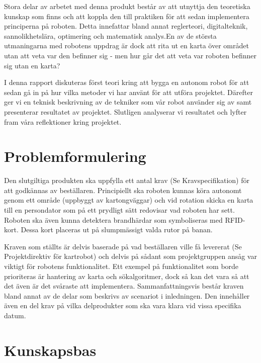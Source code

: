 \documentclass[a4paper,12pt,fleqn]{article}
\begin{document}
Stora delar av arbetet med denna produkt består av att utnyttja den teoretiska kunskap som finns och att koppla den till praktiken för att sedan implementera principerna på roboten. 
Detta innefattar bland annat reglerteori, digitalteknik, sannolikhetslära, optimering och matematisk analys.En av de största utmaningarna med robotens uppdrag är dock att rita ut en karta över området utan att veta var den befinner sig - men hur går det att veta var roboten befinner sig utan en karta?

I denna rapport diskuteras först teori kring att bygga en autonom robot för att sedan gå in på hur vilka metoder vi har använt för att utföra projektet. Därefter ger vi en teknisk beskrivning av de tekniker som vår robot använder sig av samt presenterar resultatet av projektet. Slutligen analyserar vi resultatet och lyfter fram våra reflektioner kring projektet. 

\section{Problemformulering}

Den slutgiltiga produkten ska uppfylla ett antal krav (Se Kravspecifikation) för att godkännas av beställaren. Principiellt ska roboten kunnas köra autonomt genom ett område (uppbyggt av kartongväggar) och vid rotation skicka en karta till en persondator som på ett prydligt sätt redovisar vad roboten har sett. Roboten ska även kunna detektera brandhärdar som symboliseras med RFID-kort. Dessa kort placeras ut på slumpmässigt valda rutor på banan. 

Kraven som ställts är delvis baserade på vad beställaren ville få levererat (Se Projektdirektiv för kartrobot) och delvis på sådant som projektgruppen ansåg var viktigt för robotens funktionalitet. Ett exempel på funktionalitet som borde prioriteras är hantering av karta och sökalgoritmer, dock så kan det vara så att det även är det svåraste att implementera. Sammanfattningsvis består kraven bland annat av de delar som beskrivs av scenariot i inledningen. Den innehåller även en del krav på vilka delprodukter som ska vara klara vid vissa specifika datum.


\section{Kunskapsbas}
\end{document}
